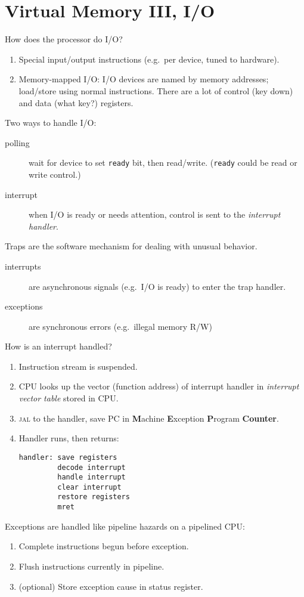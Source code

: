\chapter{Virtual Memory III, I/O}


How does the processor do I/O?
\begin{enumerate}
	\item Special input/output instructions (e.g.~per device, tuned to hardware).
	\item Memory-mapped I/O: I/O devices are named by memory addresses; load/store using normal instructions. There are a lot of control (key down) and data (what key?) registers.
\end{enumerate}
Two ways to handle I/O:
\begin{description}
	\item[polling] wait for device to set \texttt{ready} bit, then read/write. (\texttt{ready} could be read or write control.)
	\item[interrupt] when I/O is ready or needs attention, control is sent to the \emph{interrupt handler}.
\end{description}
Traps are the software mechanism for dealing with unusual behavior.
\begin{description}
	\item[interrupts] are asynchronous signals (e.g.~I/O is ready) to enter the trap handler.
	\item[exceptions] are synchronous errors (e.g.~illegal memory R/W)
\end{description}
How is an interrupt handled?
\begin{enumerate}
	\item Instruction stream is suspended.
	\item CPU looks up the vector (function address) of interrupt handler in \emph{interrupt vector table} stored in CPU.
	\item \textsc{jal} to the handler, save PC in \textbf{M}achine \textbf{E}xception \textbf{P}rogram \textbf{Counter}.
	\item Handler runs, then returns:
\begin{verbatim}
handler: save registers
         decode interrupt
         handle interrupt
         clear interrupt
         restore registers
         mret
\end{verbatim}
\end{enumerate}
Exceptions are handled like pipeline hazards on a pipelined CPU:
\begin{enumerate}
	\item Complete instructions begun before exception.
	\item Flush instructions currently in pipeline.
	\item (optional) Store exception cause in status register.
\end{enumerate}
